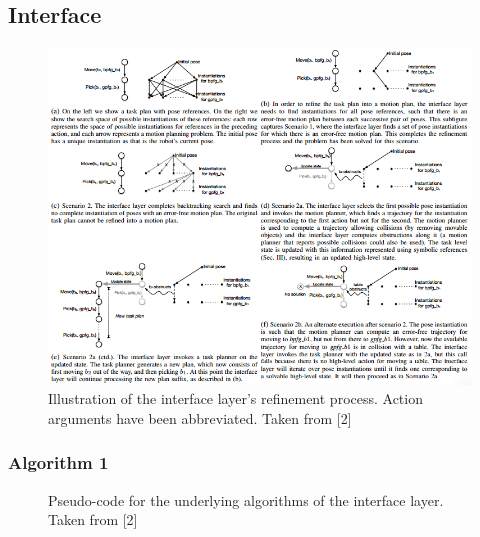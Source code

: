 \documentclass[12pt]{article}
\begin{document}
\subsection{Interface}

\begin{figure}[t]
\centering
\includegraphics[width=\textwidth]{figures/figure4.png}
\caption{Illustration of the interface layer’s refinement process. 
Action arguments have been abbreviated. 
Taken from [2]
\label{fig:figure4}}
\end{figure}

\subsubsection{Algorithm 1}

\begin{figure}[t]
	\centering
	\qquad
	\caption{Pseudo-code for the underlying algorithms of the interface layer. Taken from [2]\label{fig:algorithms}}
\end{figure}
\end{document}
